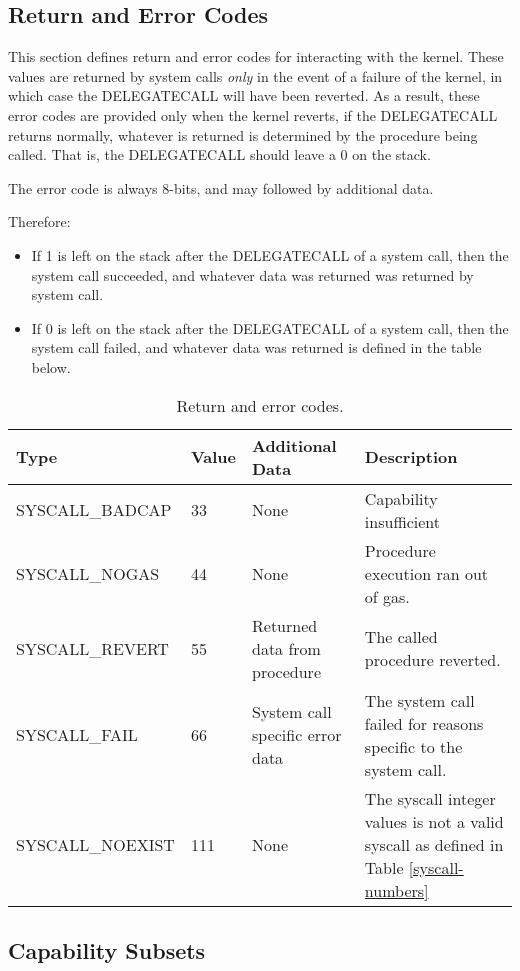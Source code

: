 \documentclass[english,a4paper]{article}
\begin{document}
\subsection{Return and Error Codes}\label{errors}
This section defines return and error codes for interacting with the kernel.
These values are returned by system calls \emph{only} in the event of a failure
of the kernel, in which case the DELEGATECALL will have been reverted. As a
result, these error codes are provided only when the kernel reverts, if the
DELEGATECALL returns normally, whatever is returned is determined by the
procedure being called. That is, the DELEGATECALL should leave a 0 on the stack.

The error code is always 8-bits, and may followed by additional data.

Therefore:

\begin{itemize}
  \item If 1 is left on the stack after the DELEGATECALL of a system call, then
  the system call succeeded, and whatever data was returned was returned by
  system call.
  \item If 0 is left on the stack after the DELEGATECALL of a system call, then
  the system call failed, and whatever data was returned is defined in the table
  below.
\end{itemize}

\begin{table}[H]
  \caption{Return and error codes.}
  \centering{}%
  \begin{tabular}{p{}|p{}|p{}|p{}}
    \hline
    Type & Value & Additional Data & Description\tabularnewline
    \hline
    \hline
    SYSCALL\_BADCAP  & 33 & None & Capability insufficient \tabularnewline
    SYSCALL\_NOGAS   & 44 & None & Procedure execution ran out of gas.
      \tabularnewline
    SYSCALL\_REVERT  & 55 & Returned data from procedure & The called
      procedure reverted. \tabularnewline
    SYSCALL\_FAIL    & 66 & System call specific error data & The system call
      failed for reasons specific to the system call. \tabularnewline
    SYSCALL\_NOEXIST & 111 & None & The syscall integer values is not a valid
      syscall as defined in Table \ref{syscall-numbers} \tabularnewline
    \hline
  \end{tabular}
\end{table}

\subsection{Capability Subsets}\label{cap-subsets}
\end{document}
